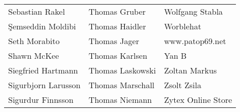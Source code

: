 \begin{small}
\begin{tabular}{p{4cm}p{4cm}p{4cm}}
Sebastian Rakel & Thomas Gruber & Wolfgang Stabla \\
Şemseddin Moldibi & Thomas Haidler & Worblehat \\
Seth Morabito & Thomas Jager & www.patop69.net \\
Shawn McKee & Thomas Karlsen & Yan B \\
Siegfried Hartmann & Thomas Laskowski & Zoltan Markus \\
Sigurbjorn Larusson & Thomas Marschall & Zsolt Zsila \\
Sigurdur Finnsson & Thomas Niemann & Zytex Online Store \\
\end{tabular}
\end{small}

\ifdefined\printmanual
\else
{}
\fi

